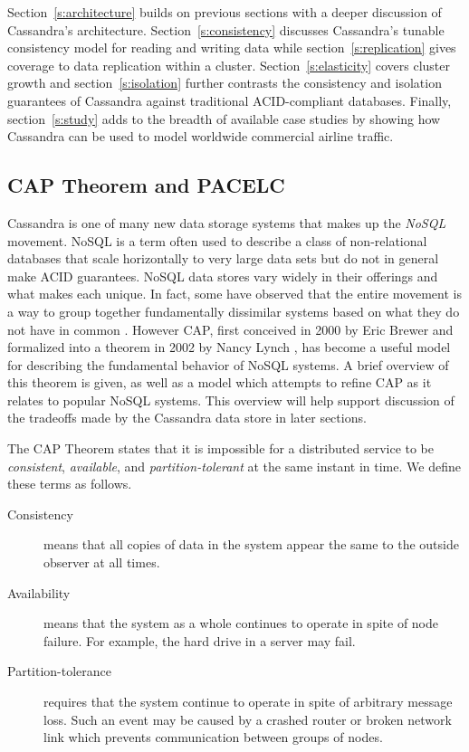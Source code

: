 \documentclass[twocolumn]{article}
\begin{document}
Section~\ref{s:architecture} builds on previous sections with a deeper discussion of Cassandra's architecture. Section~\ref{s:consistency} discusses Cassandra's tunable consistency model for reading and writing data while section~\ref{s:replication} gives coverage to data replication within a cluster.  Section~\ref{s:elasticity} covers cluster growth and section~\ref{s:isolation} further contrasts the consistency and isolation guarantees of Cassandra against traditional ACID-compliant databases.  Finally, section~\ref{s:study} adds to the breadth of available case studies by showing how Cassandra can be used to model worldwide commercial airline traffic.

\subsection{CAP Theorem and PACELC}\label{s:cap}

Cassandra is one of many new data storage systems that makes up the \emph{NoSQL} movement.  NoSQL is a term often used to describe a class of non-relational databases that scale horizontally to very large data sets but do not in general make ACID guarantees.  NoSQL data stores vary widely in their offerings and what makes each unique.  In fact, some have observed that the entire movement is a way to group together fundamentally dissimilar systems based on what they do not have in common \cite{ref:datascience}.  However CAP, first conceived in 2000 by Eric Brewer and formalized into a theorem in 2002 by Nancy Lynch \cite{ref:brewer}, has become a useful model for describing the fundamental behavior of NoSQL systems.  A brief overview of this theorem is given, as well as a model which attempts to refine CAP as it relates to popular NoSQL systems. This overview will help support discussion of the tradeoffs made by the Cassandra data store in later sections.

The CAP Theorem states that it is impossible for a distributed service to be \emph{consistent}, \emph{available}, and \emph{partition-tolerant} at the same instant in time.  We define these terms as follows.

\begin{description}
\item[Consistency] means that all copies of data in the system appear the same to the outside observer at all times.
\item[Availability] means that the system as a whole continues to operate in spite of node failure.  For example, the hard drive in a server may fail.
\item[Partition-tolerance] requires that the system continue to operate in spite of arbitrary message loss.  Such an event may be caused by a crashed router or broken network link which prevents communication between groups of nodes.
\end{description}
\end{document}
